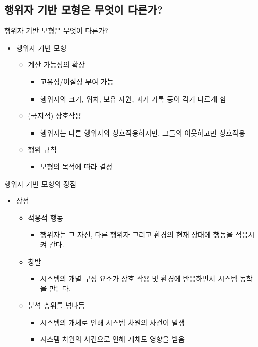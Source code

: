 \documentclass[hyperref={unicode}]{beamer}
\begin{document}
\subsection*{행위자 기반 모형은 무엇이 다른가?}
\begin{frame}{행위자 기반 모형은 무엇이 다른가?}
\begin{itemize}
\item 행위자 기반 모형
	\begin{itemize}
	\item 계산 가능성의 확장
		\begin{itemize}
		\item 고유성/이질성 부여 가능
		\item 행위자의 크기, 위치, 보유 자원, 과거 기록 등이 각기 다르게 함
		\end{itemize}
	\item (국지적) 상호작용
		\begin{itemize}
		\item 행위자는 다른 행위자와 상호작용하지만, 그들의 이웃하고만 상호작용
		\end{itemize}
	\item 행위 규칙
		\begin{itemize}
		\item 모형의 목적에 따라 결정
		\end{itemize}
	\end{itemize}	
\end{itemize}	
\end{frame}


\begin{frame}{행위자 기반 모형의 장점}
\begin{itemize}
\item 장점
	\begin{itemize}
	\item 적응적 행동
		\begin{itemize}
		\item 행위자는 그 자신, 다른 행위자 그리고 환경의 현재 상태에 행동을 적응시켜 간다.
		\end{itemize}
	\item 창발
		\begin{itemize}
		\item 시스템의 개별 구성 요소가 상호 작용 및 환경에 반응하면서 시스템 동학을 만든다.
		\end{itemize}
	\item 분석 층위를 넘나듬
		\begin{itemize}
		\item 시스템의 개체로 인해 시스템 차원의 사건이 발생
		\item 시스템 차원의 사건으로 인해 개체도 영향을 받음
		\end{itemize}
	\end{itemize}
\end{itemize}	
\end{frame}
\end{document}
